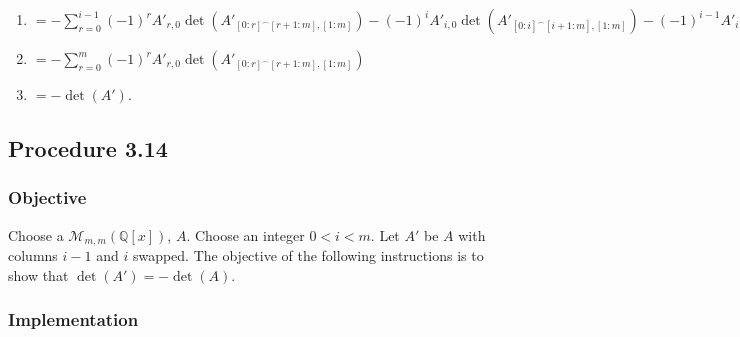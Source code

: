 \documentclass[twocolumn]{article}
\newcommand{\procedure}[2][]{\subsection*{Procedure #2 \ifthenelse{\equal{#1}{}}{}{(#1)}}\label{sec:procedure #2}}
\newcommand{\objective}{\subsubsection*{Objective}}
\newcommand{\implementation}{\subsubsection*{Implementation}}
\begin{document}
\begin{enumerate}
\begin{enumerate}
\begin{enumerate}
							\item $=-\sum_{r=0}^{i-1} (-1)^rA'_{r,0}\det(A'_{[0:r]^\frown[r+1:m],[1:m]})-(-1)^{i}A'_{i,0}\det(A'_{[0:i]^\frown[i+1:m],[1:m]})-(-1)^{i-1}A'_{i-1,0}\det(A'_{[0:i-1]^\frown[i:m],[1:m]})-\sum_{r=i+1}^m (-1)^rA'_{r,0}\det(A'_{[0:r]^\frown[r+1:m],[1:m]})$
							\item $=-\sum_{r=0}^m (-1)^rA'_{r,0}\det(A'_{[0:r]^\frown[r+1:m],[1:m]})$
							\item $=-\det(A')$.
						\end{enumerate}
					\end{enumerate}
				\end{enumerate}
		\procedure{3.14}
			\objective
				Choose a $\mathcal{M}_{m,m}(\mathbb{Q}[x])$, $A$. Choose an integer $0<i<m$. Let $A'$ be $A$ with columns $i-1$ and $i$ swapped. The objective of the following instructions is to show that $\det(A')=-\det(A)$.
			\implementation
\end{document}
